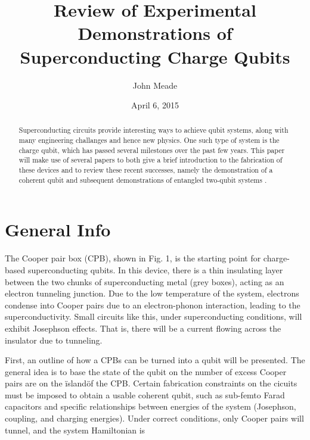 \documentclass[12pt,letterpaper,notitlepage]{report}
\begin{document}
\title{Review of Experimental Demonstrations of Superconducting Charge Qubits}
\author{John Meade}
\date{April 6, 2015}

\maketitle

\begin{abstract}
\doublespacing
\noindent
Superconducting circuits provide interesting ways to achieve qubit systems, along with many engineering challanges and hence new physics. One such type of system is the charge qubit, which has passed several milestones over the past few years. This paper will make use of several papers to both give a brief introduction to the fabrication of these devices and to review these recent successes, namely the demonstration of a coherent qubit \cite{singleCooperPair} and subsequent demonstrations of entangled two-qubit systems \cite{twoPulseGates}\cite{onePulseGateNature}\cite{onePulseGatePhysica}.
\end{abstract}

\pagebreak
\doublespacing

%
%

\section*{General Info}

The Cooper pair box (CPB), shown in Fig. 1, is the starting point for charge-based superconducting qubits. In this device, there is a thin insulating layer between the two chunks of superconducting metal (grey boxes), acting as an electron tunneling junction. Due to the low temperature of the system, electrons condense into Cooper pairs due to an electron-phonon interaction, leading to the superconductivity. Small circuits like this, under superconducting conditions, will exhibit Josephson effects. That is, there will be a current flowing across the insulator due to tunneling.

\hfill

First, an outline of how a CPBs can be turned into a qubit will be presented. The general idea is to base the state of the qubit on the number of excess Cooper pairs are on the \"island\" of the CPB. Certain fabrication constraints on the cicuits must be imposed to obtain a usable coherent qubit, such as sub-femto Farad capacitors and specific relationships between energies of the system (Josephson, coupling, and charging energies). Under correct conditions, only Cooper pairs will tunnel, and the system Hamiltonian is
\end{document}
